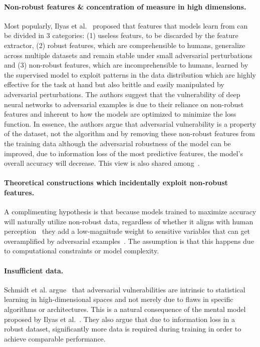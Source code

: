 \documentclass[a4paper, oneside]{discothesis}
\begin{document}
\paragraph{Non-robust features \& concentration of measure in high dimensions.} Most popularly, Ilyas et al.\ \cite{ilyas2019adversarial} proposed that features that models learn from can be divided in 3 categories: (1) useless featurs, to be discarded by the feature extractor, (2) robust features, which are comprehensible to humans, generalize across multiple datasets and remain stable under small adversarial perturbations and (3) non-robust features, which are incomprehensible to humans, learned by the supervised model to exploit patterns in the data distribution which are highly effective for the task at hand but also brittle and easily manipulated by adversarial perturbations. The authors suggest that the vulnerability of deep neural networks to adversarial examples is due to their reliance on non-robust features and inherent to how the models are optimized to minimize the loss function. In essence, the authors argue that adversarial vulnerability is a property of the dataset, not the algorithm and by removing these non-robust features from the training data although the adversarial robustness of the model can be improved, due to information loss of the most predictive features, the model's overall accuracy will decrease. This view is also shared among~\cite{engstrom2019a, raghunathan2018certified, wong2018provable, xiao2018training, cohen2019certified, fawzi2018adversarial, mahloujifar2019curse, shafahi2018adversarial, gilmer2018adversarial, madry2017towards}.

\paragraph{Theoretical constructions which incidentally exploit non-robust features.} A complimenting hypothesis is that because models trained to maximize accuracy will naturally utilize non-robust data, regardless of whether it aligns with human perception~\cite{ilyas2019adversarial} they add a low-magnitude weight to sensitive variables that can get overamplified by adversarial examples~\cite{bubeck2019adversarial, nakkiran2019adversarial}. The assumption is that this happens due to computational constraints or model complexity.

\paragraph{Insufficient data.} Schmidt et al. argue~\cite{schmidt2018adversarially} that adversarial vulnerabilities are intrinsic to statistical learning in high-dimensional spaces and not merely due to flaws in specific algorithms or architectures. This is a natural consequence of the mental model proposed by Ilyas et al.\ \cite{ilyas2019adversarial}. They also argue that due to information loss in a robust dataset, significantly more data is required during training in order to achieve comparable performance.
\end{document}
